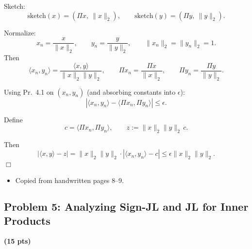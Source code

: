 \documentclass[10pt]{article}
\newcommand{\spara}[1]{\vspace{.5em}\noindent {\large\sffamily\textcolor{nyuOfficialPurple}{#1}}}
\begin{document}
\begin{enumerate}[label=\arabic*.]
Sketch:
\[
\text{sketch}(x) = (\Pi x,\ \|x\|_2),
\qquad
\text{sketch}(y) = (\Pi y,\ \|y\|_2).
\]

Normalize:
\[
x_n=\frac{x}{\|x\|_2},
\qquad
y_n=\frac{y}{\|y\|_2},
\qquad
\|x_n\|_2=\|y_n\|_2=1.
\]
Then
\[
\langle x_n,y_n\rangle = \frac{\langle x,y\rangle}{\|x\|_2\|y\|_2},
\qquad
\Pi x_n = \frac{\Pi x}{\|x\|_2},
\qquad
\Pi y_n = \frac{\Pi y}{\|y\|_2}.
\]

Using Pr.\ 4.1 on $(x_n,y_n)$ (and absorbing constants into $\epsilon$):
\[
|\langle x_n,y_n\rangle - \langle \Pi x_n,\Pi y_n\rangle|
\le \epsilon.
\]

Define
\[
c=\langle \Pi x_n,\Pi y_n\rangle,
\qquad
z := \|x\|_2\|y\|_2\,c.
\]

Then
\[
|\langle x,y\rangle - z|
=
\|x\|_2\|y\|_2\cdot |\langle x_n,y_n\rangle - c|
\le
\epsilon\|x\|_2\|y\|_2.
\]
\(\Box\)

\spara{Notes (Pr. 4.2)}
\begin{itemize}
\item Copied from handwritten pages 8--9.
\end{itemize}

\end{enumerate}



\subsection{Problem 5: Analyzing Sign-JL and JL for Inner Products}
\textbf{(15 pts)}
\end{document}

